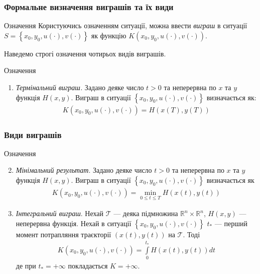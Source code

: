 \documentclass[10pt,pdf,aspectratio=169]{beamer}
\newcommand{\R}{\mathbb{R}}
\newcommand{\T}{\mathcal{T}}
\renewcommand{\l}{\left}
\renewcommand{\r}{\right}
\newcommand{\intl}{\int\limits}
\begin{document}
    \begin{frame}
        \frametitle{Формальне визначення виграшів та їх види}

        \begin{block}{Означення}
            Користуючись означенням ситуації, можна ввести \emph{виграш} в ситуації $S = \l\{x_0, y_0, u(\cdot), v(\cdot) \r\}$
            як функцію $K(x_0, y_0, u(\cdot), v(\cdot))$.
        \end{block}

        Наведемо строгі означення чотирьох видів виграшів.

        \begin{block}{Означення}
            \begin{enumerate}
                \item \emph{Термінальний виграш.} Задано деяке число $t>0$ та неперервна по $x$ та $y$ функція $H(x, y)$. Виграш в ситуації $\l\{x_0, y_0, u(\cdot), v(\cdot) \r\}$
                визначається як:
                \begin{gather*}
                    K(x_0, y_0, u(\cdot), v(\cdot)) = H(x(T), y(T))
                \end{gather*}
            \end{enumerate}
        \end{block}
    \end{frame}
    \begin{frame}
        \frametitle{Види виграшів}
        
        \begin{block}{Означення}
            \begin{enumerate}
                \setcounter{enumi}{1}
                \item \emph{Мінімальний результат}. Задано деяке число $t>0$ та неперервна по $x$ та $y$ функція $H(x, y)$. Виграш в ситуації $\l\{x_0, y_0, u(\cdot), v(\cdot) \r\}$
                визначається як
                \begin{gather*}
                    K(x_0, y_0, u(\cdot), v(\cdot)) = \underset{0 \leq t \leq T}{\min} H(x(t), y(t))
                \end{gather*}

                \item  \emph{Інтегральний виграш}. Нехай $\T$ --- деяка підмножина $\R^n \times \R^n$, $H(x, y)$ --- неперервна функція. Нехай в ситуації $\l\{x_0, y_0, u(\cdot), v(\cdot) \r\}$
                $t_*$ --- перший момент потрапляння траєкторії $(x(t), y(t))$ на $\T$.
                Тоді
                \begin{gather*}
                    K(x_0, y_0, u(\cdot), v(\cdot)) = \intl_0^{t_*} H(x(t), y(t)) dt
                \end{gather*}
                де при $t_* = +\infty$ покладається $K = +\infty$.

            \end{enumerate}
        \end{block}
    
    \end{frame}
\end{document}
